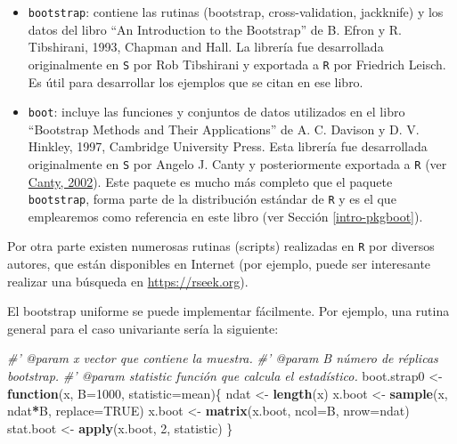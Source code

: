 \documentclass[
]{book}
\newenvironment{Shaded}{\begin{snugshade}}{\end{snugshade}}
\newcommand{\CommentTok}[1]{\textcolor[rgb]{0.56,0.35,0.01}{\textit{#1}}}
\newcommand{\ControlFlowTok}[1]{\textcolor[rgb]{0.13,0.29,0.53}{\textbf{#1}}}
\newcommand{\DataTypeTok}[1]{\textcolor[rgb]{0.13,0.29,0.53}{#1}}
\newcommand{\DecValTok}[1]{\textcolor[rgb]{0.00,0.00,0.81}{#1}}
\newcommand{\KeywordTok}[1]{\textcolor[rgb]{0.13,0.29,0.53}{\textbf{#1}}}
\newcommand{\NormalTok}[1]{#1}
\newcommand{\OperatorTok}[1]{\textcolor[rgb]{0.81,0.36,0.00}{\textbf{#1}}}
\newcommand{\OtherTok}[1]{\textcolor[rgb]{0.56,0.35,0.01}{#1}}
\newcommand{\StringTok}[1]{\textcolor[rgb]{0.31,0.60,0.02}{#1}}
\theoremstyle{break}
\theoremstyle{definition}
\theoremstyle{definition}
\theoremstyle{definition}
\theoremstyle{remark}
\begin{document}
\begin{itemize}
\item
  \texttt{bootstrap}: contiene las rutinas (bootstrap, cross-validation,
  jackknife) y los datos del libro ``An Introduction to the Bootstrap'' de B.
  Efron y R. Tibshirani, 1993, Chapman and Hall. La librería fue
  desarrollada originalmente en \texttt{S} por Rob Tibshirani y exportada a \texttt{R} por
  Friedrich Leisch. Es útil para desarrollar los ejemplos que se citan en
  ese libro.
\item
  \texttt{boot}: incluye las funciones y conjuntos de datos utilizados en el libro
  ``Bootstrap Methods and Their Applications'' de A. C. Davison y D. V. Hinkley, 1997,
  Cambridge University Press. Esta librería fue desarrollada originalmente
  en \texttt{S} por Angelo J. Canty y posteriormente exportada a \texttt{R} (ver \href{http://cran.fhcrc.org/doc/Rnews/Rnews_2002-3.pdf}{Canty, 2002}).
  Este paquete es mucho más completo que el paquete \texttt{bootstrap}, forma parte de la distribución estándar de \texttt{R} y es el que emplearemos como referencia en este libro (ver Sección \ref{intro-pkgboot}).
\end{itemize}

Por otra parte existen numerosas rutinas (scripts) realizadas en \texttt{R} por
diversos autores, que están disponibles en Internet
(por ejemplo, puede ser interesante realizar una búsqueda en
\url{https://rseek.org}).

El bootstrap uniforme se puede implementar fácilmente. Por ejemplo,
una rutina general para el caso univariante sería la siguiente:

\begin{Shaded}
\begin{Highlighting}[]
\CommentTok{#' @param x vector que contiene la muestra.}
\CommentTok{#' @param B número de réplicas bootstrap.}
\CommentTok{#' @param statistic función que calcula el estadístico.}
\NormalTok{boot.strap0 <-}\StringTok{ }\ControlFlowTok{function}\NormalTok{(x, }\DataTypeTok{B=}\DecValTok{1000}\NormalTok{, }\DataTypeTok{statistic=}\NormalTok{mean)\{}
\NormalTok{  ndat <-}\StringTok{ }\KeywordTok{length}\NormalTok{(x)}
\NormalTok{  x.boot <-}\StringTok{ }\KeywordTok{sample}\NormalTok{(x, ndat}\OperatorTok{*}\NormalTok{B, }\DataTypeTok{replace=}\OtherTok{TRUE}\NormalTok{)}
\NormalTok{  x.boot <-}\StringTok{ }\KeywordTok{matrix}\NormalTok{(x.boot, }\DataTypeTok{ncol=}\NormalTok{B, }\DataTypeTok{nrow=}\NormalTok{ndat)}
\NormalTok{  stat.boot <-}\StringTok{ }\KeywordTok{apply}\NormalTok{(x.boot, }\DecValTok{2}\NormalTok{, statistic)}
\NormalTok{\}}
\end{Highlighting}
\end{Shaded}
\end{document}

